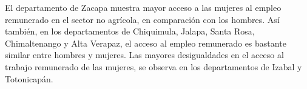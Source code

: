  El departamento de Zacapa muestra mayor acceso a las mujeres al empleo remunerado en el sector no agrícola, en comparación con los hombres. Así también, en los departamentos de Chiquimula, Jalapa, Santa Rosa, Chimaltenango y Alta Verapaz, el acceso al empleo remunerado es bastante similar entre hombres y mujeres. Las mayores desigualdades en el acceso al trabajo remunerado de las mujeres, se observa en los departamentos de Izabal y Totonicapán.